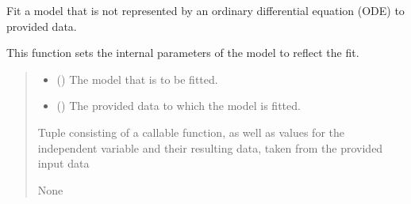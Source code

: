 \documentclass[letterpaper,10pt,english]{sphinxmanual}
\begin{document}

\begin{fulllineitems}
\label{\detokenize{ModelFitter:src.ModelFitter._fit_reg}}
\pysigstartsignatures
{}
\pysigstopsignatures
\sphinxAtStartPar
Fit a model that is not represented by an ordinary differential equation (ODE) to provided data.

\sphinxAtStartPar
This function sets the internal parameters of the model to reflect the fit.
\begin{quote}\begin{description}
\begin{itemize}
\item {} 
\sphinxAtStartPar
{} ({\hyperref[\detokenize{VPCModel:src.VPCModel.VPCModel}]{}}) \textendash{} The model that is to be fitted.

\item {} 
\sphinxAtStartPar
{} (\sphinxstyleliteralemphasis{\sphinxupquote{{[}}}\sphinxstyleliteralemphasis{\sphinxupquote{{[}}}\sphinxstyleliteralemphasis{\sphinxupquote{  |  }}\sphinxstyleliteralemphasis{\sphinxupquote{{]}}}\sphinxstyleliteralemphasis{\sphinxupquote{{]}}}) \textendash{} The provided data to which the model is fitted.

\end{itemize}

\sphinxAtStartPar
Tuple consisting of a callable function, as well as values    for the independent variable and their resulting data, taken from the provided input data

\sphinxAtStartPar
None

\end{description}\end{quote}

\end{fulllineitems}
\end{document}
